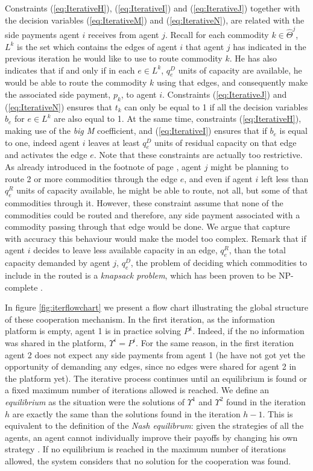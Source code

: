 \documentclass{article}
\begin{document}
Constraints (\ref{eq:IterativeH}),  (\ref{eq:IterativeI}) and (\ref{eq:IterativeJ}) together with the decision variables (\ref{eq:IterativeM}) and (\ref{eq:IterativeN}), are related with the side payments agent $i$ receives from agent $j$. Recall for each commodity $k\in \widehat{\Theta}^j$, $L^k$ is the set which contains the edges of agent $i$ that agent $j$ has indicated in the previous iteration he would like to use to route commodity $k$. He has also indicates that if and only if in each $e \in L^k$, $q_e^D$ units of capacity are available, he would be able to route the commodity $k$ using that edges, and consequently make the associated side payment, $p_k$, to agent $i$. Constraints (\ref{eq:IterativeJ}) and (\ref{eq:IterativeN}) ensures that $t_k$ can only be equal to 1 if all the decision variables $b_e$ for $e \in L^k$ are also equal to 1. At the same time, constraints (\ref{eq:IterativeH}),  making use of the \emph{big M} coefficient, and (\ref{eq:IterativeI}) ensures that if $b_e$ is equal to one, indeed agent $i$ leaves at least $q_e^D$ units of residual capacity on that edge and activates the edge $e$. Note that these constraints are actually too restrictive. As already introduced in the footnote of page \pageref{ft:sidepaymentexplanation}, agent $j$ might be planning to route 2 or more commodities through the edge $e$, and even if agent $i$ left less than $q_e^R$ units of capacity available, he might be able to route, not all, but some of that commodities through it. However, these constraint assume that none of the commodities could be routed and therefore, any side payment associated with a commodity passing through that edge would be done. We argue that capture with accuracy this behaviour would make the model too complex. Remark that if agent $i$ decides to leave less available capacity in an edge, $q_e^R$, than the total capacity demanded by agent $j$, $q_e^D$, the problem of deciding which commodities to include in the routed is a \emph{knapsack problem}, which has been proven to be NP-complete \parencite{KARP1972}.

In figure \ref{fig:iterflowchart} we present a flow chart illustrating the global structure of these cooperation mechanism.
In the first iteration, as the information platform is empty, agent 1 is in practice solving $P^1$. Indeed, if the no information was shared in the platform, $\Upsilon^i=P^i$. For the same reason, in the first iteration agent 2 does not expect any side payments from agent 1 (he have not got yet the opportunity of demanding any edges, since no edges were shared for agent 2 in the platform yet). The iterative process continues until an equilibrium is found or a fixed maximum number of iterations allowed is reached. We define an \emph{equilibrium} as the situation were the solutions of $\Upsilon^1$ and $\Upsilon^2$ found in the iteration $h$ are exactly the same than the solutions found in the iteration $h-1$. This is equivalent to the definition of the \emph{Nash equilibrum}: given the strategies of all the agents, an agent cannot individually improve their payoffs by changing his own strategy \parencite{GONZALEZ2010}. If no equilibrium is reached in the maximum number of iterations allowed, the system considers that no solution for the cooperation was found.
\end{document}
